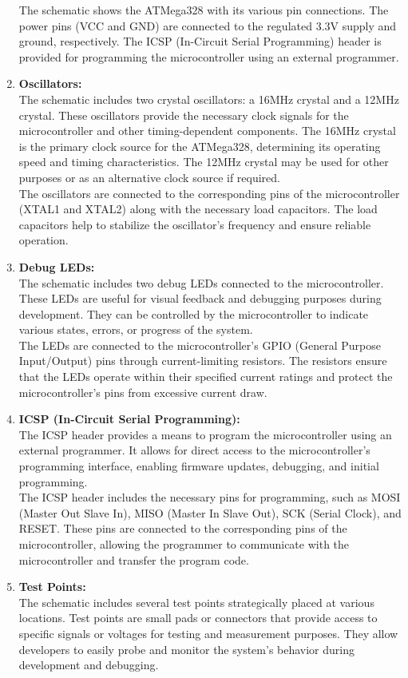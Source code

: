 \documentclass[a4paper,11pt]{article}%
\begin{document}
\begin{enumerate}
	      The schematic shows the ATMega328 with its various pin connections. The power pins (VCC and GND) are connected to the regulated 3.3V supply and ground, respectively. The ICSP (In-Circuit Serial Programming) header is provided for programming the microcontroller using an external programmer.
	\item \textbf{Oscillators:}\\
	      The schematic includes two crystal oscillators: a 16MHz crystal and a 12MHz crystal. These oscillators provide the necessary clock signals for the microcontroller and other timing-dependent components. The 16MHz crystal is the primary clock source for the ATMega328, determining its operating speed and timing characteristics. The 12MHz crystal may be used for other purposes or as an alternative clock source if required.\\

	      The oscillators are connected to the corresponding pins of the microcontroller (XTAL1 and XTAL2) along with the necessary load capacitors. The load capacitors help to stabilize the oscillator's frequency and ensure reliable operation.
	\item \textbf{Debug LEDs:}\\
	      The schematic includes two debug LEDs connected to the microcontroller. These LEDs are useful for visual feedback and debugging purposes during development. They can be controlled by the microcontroller to indicate various states, errors, or progress of the system.\\

	      The LEDs are connected to the microcontroller's GPIO (General Purpose Input/Output) pins through current-limiting resistors. The resistors ensure that the LEDs operate within their specified current ratings and protect the microcontroller's pins from excessive current draw.
	\item \textbf{ICSP (In-Circuit Serial Programming):}\\
	      The ICSP header provides a means to program the microcontroller using an external programmer. It allows for direct access to the microcontroller's programming interface, enabling firmware updates, debugging, and initial programming.\\

	      The ICSP header includes the necessary pins for programming, such as MOSI (Master Out Slave In), MISO (Master In Slave Out), SCK (Serial Clock), and RESET. These pins are connected to the corresponding pins of the microcontroller, allowing the programmer to communicate with the microcontroller and transfer the program code.
	\item \textbf{Test Points:}\\
	      The schematic includes several test points strategically placed at various locations. Test points are small pads or connectors that provide access to specific signals or voltages for testing and measurement purposes. They allow developers to easily probe and monitor the system's behavior during development and debugging.\\


\end{enumerate}
\end{document}
